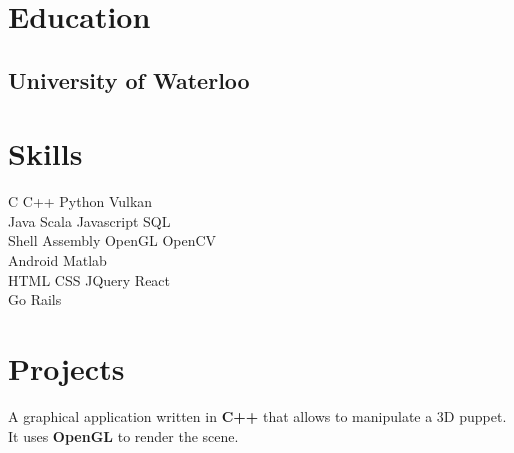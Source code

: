 \documentclass[]{deedy-resume-openfont}
\begin{document}
%
%

%
%

\begin{minipage}[t]{0.33\textwidth} 


\section{Education} 

\subsection{University of Waterloo}
\sectionsep


\section{Skills}
    C \textbullet{} C++ \textbullet{} Python \textbullet{} Vulkan \\
Java \textbullet{} Scala \textbullet{} Javascript \textbullet{} SQL \\
Shell \textbullet{} Assembly \textbullet{} OpenGL \textbullet{} OpenCV \\
Android \textbullet{} Matlab\\
HTML \textbullet{} CSS \textbullet{} JQuery \textbullet{} React \\
Go \textbullet{} Rails
\sectionsep


\section{Projects}
A graphical application written in \textbf{C++} that allows to manipulate a 3D puppet. It uses
\textbf{OpenGL} to render the scene.
\sectionsep


\end{minipage}
\end{document}
